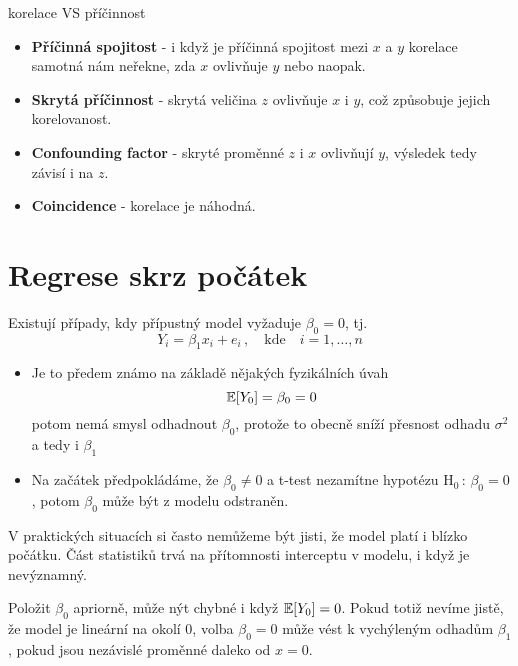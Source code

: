 \begin{remark}
 korelace VS příčinnost
 
 \begin{itemize}
  \item \textbf{Příčinná spojitost} - i když je příčinná spojitost mezi $ x $ a $ y $ korelace samotná nám neřekne, zda $ x $ ovlivňuje $ y $ nebo naopak.
  \item \textbf{Skrytá příčinnost} - skrytá veličina $ z $ ovlivňuje $ x $ i $ y $, což způsobuje jejich korelovanost.
  \item \textbf{Confounding factor} - skryté proměnné $ z $ i $ x $ ovlivňují $ y $, výsledek tedy závisí i na $ z $.
  \item \textbf{Coincidence} - korelace je náhodná.
\end{itemize}
\end{remark}

\section{Regrese skrz počátek}
Existují případy, kdy přípustný model vyžaduje $ \beta_0 = 0 $, tj. 
$$
 Y_i = \beta_1 x_i + e_i \, , \quad \text{kde} \quad i = 1,\dots,n
$$

\begin{example}
 \begin{itemize}
  \item Je to předem známo na základě nějakých fyzikálních úvah 
  $$
 \mathbb{E} [Y_0] = \beta_0 = 0
$$
		potom nemá smysl odhadnout $ \beta_0 $, protože to obecně sníží přesnost odhadu $ \sigma^{2} $ a tedy i $ \beta_1 $
  \item Na začátek předpokládáme, že $ \beta_0 \neq 0 $ a t-test nezamítne hypotézu $ \text{H}_0 \, : \, \beta_0 = 0 $, potom $ \beta_0 $ může být z modelu odstraněn.
\end{itemize}
\end{example}

\begin{remark}
V praktických situacích si často nemůžeme být jisti, že model platí i blízko počátku. Část statistiků trvá na přítomnosti interceptu v modelu, i když je nevýznamný.

Položit $ \beta_0 $ apriorně, může nýt chybné i když $ \mathbb{E} [ Y_0 ] = 0 $. Pokud totiž nevíme jistě, že model je lineární na okolí 0, volba $ \beta_0 = 0 $ může vést k vychýleným odhadům $ \beta_1 $, pokud jsou nezávislé proměnné daleko od $ x = 0 $.
\end{remark}


